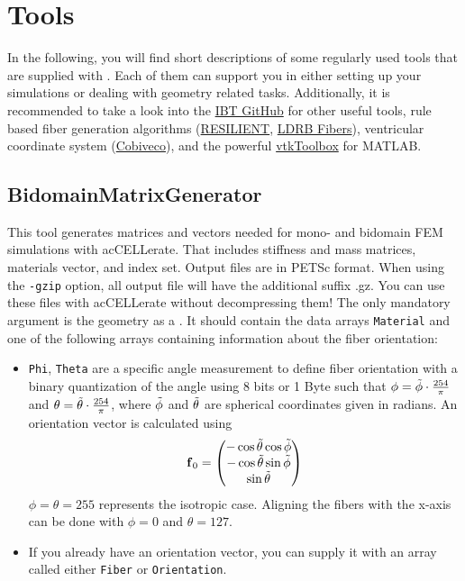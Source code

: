 \section{Tools}
\label{sec:tools}

In the following, you will find short descriptions of some regularly used tools that are supplied with \CM.
Each of them can support you in either setting up your simulations or dealing with geometry related tasks.
Additionally, it is recommended to take a look into the \href{https://github.com/KIT-IBT}{IBT GitHub} for other useful tools, \eg rule based fiber generation algorithms (\href{https://github.com/KIT-IBT/RESILIENT}{RESILIENT}, \href{https://github.com/KIT-IBT/LDRB_Fibers}{LDRB Fibers}), ventricular coordinate system (\href{https://github.com/KIT-IBT/Cobiveco}{Cobiveco}), and the powerful \href{https://github.com/KIT-IBT/vtkToolbox}{vtkToolbox} for MATLAB.

\subsection{BidomainMatrixGenerator}
\label{tools:BidomainMatrixGenerator}

This tool generates matrices and vectors needed for mono- and bidomain FEM simulations with acCELLerate. 
That includes stiffness and mass matrices, materials vector, and index set. 
Output files are in PETSc format.
When using the \verb|-gzip| option, all output file will have the additional suffix .gz. You can use these files with acCELLerate without decompressing them!
The only mandatory argument is the geometry as a .
It should contain the data arrays \verb|Material| and one of the following arrays containing information about the fiber orientation:
\begin{itemize}
    \item \verb|Phi|, \verb|Theta| are a specific angle measurement to define fiber orientation with a binary quantization of the angle using 8 bits or 1 Byte such that $\phi = \Tilde{\phi} \cdot \frac{254}{\pi}$ and $\theta = \Tilde{\theta} \cdot \frac{254}{\pi}$, where $\Tilde{\phi}$ and $\Tilde{\theta}$ are spherical coordinates given in radians.
    An orientation vector is calculated using
    \begin{equation}
        \vec f_0 = \mqty( -\cos \Tilde{\theta} \cos\Tilde{\phi} \\ -\cos\Tilde{\theta} \sin\Tilde{\phi} \\ \sin\Tilde{\theta} )
    \end{equation}
    $\phi = \theta = 255$ represents the isotropic case.
    Aligning the fibers with the x-axis can be done with $\phi = 0$ and $\theta = 127$.

    \item If you already have an orientation vector, you can supply it with an array called either \verb|Fiber| or \verb|Orientation|.
\end{itemize}

